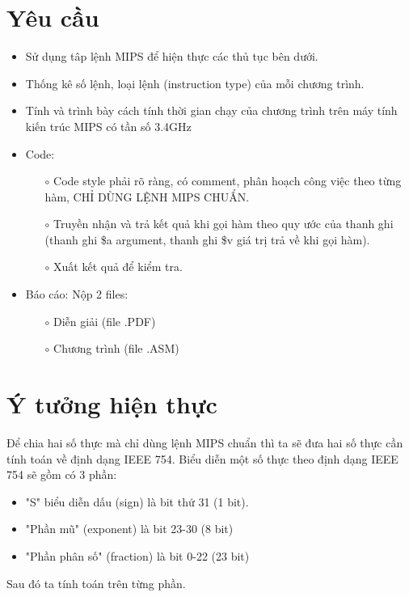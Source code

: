 \documentclass[a4paper]{article}
\begin{document}
\section{Yêu cầu}
\begin{itemize}
	\item Sử dụng tâp lệnh MIPS để hiện thực các thủ tục bên dưới.
	\item Thống kê số lệnh, loại lệnh (instruction type) của mỗi chương trình.
	\item Tính và trình bày cách tính thời gian chạy của chương trình trên máy tính kiến trúc MIPS có tần số 3.4GHz
	\item Code:
	\begin{itemize}
		\item [$\circ$] Code style phải rõ ràng, có comment, phân hoạch công việc theo từng hàm, CHỈ DÙNG LỆNH MIPS CHUẨN.
		\item [$\circ$] Truyền nhận và trả kết quả khi gọi hàm theo quy ước của thanh ghi (thanh ghi \$a argument, thanh ghi \$v giá trị trả về khi gọi hàm).
		\item [$\circ$] Xuất kết quả để kiểm tra.
	\end{itemize}
	\item Báo cáo: Nộp 2 files:
	\begin{itemize}
		\item [$\circ$] Diễn giải (file .PDF)
		\item [$\circ$] Chương trình (file .ASM)
	\end{itemize}
\end{itemize}
\section{Ý tưởng hiện thực}
Để chia hai số thực mà chỉ dùng lệnh MIPS chuẩn thì ta sẽ đưa hai số thực cần tính toán về định dạng IEEE 754. Biểu diễn một số thực theo định dạng IEEE 754 sẽ gồm có 3 phần:
\begin{itemize}
	\item "S" biểu diễn dấu (sign) là bit thứ 31 (1 bit). 
	\item "Phần mũ" (exponent) là bit 23-30 (8 bit)
	\item "Phần phân số" (fraction) là bit 0-22 (23 bit)
\end{itemize}
Sau đó ta tính toán trên từng phần.
\end{document}
